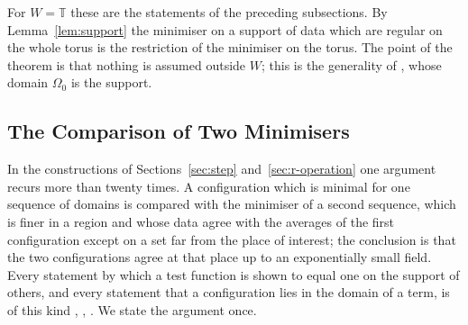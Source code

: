 \documentclass[11pt]{preprint}
\numberwithin{equation}{section}
\begin{document}
For $W = \mathbb T$ these are the statements of the preceding subsections. By Lemma~\ref{lem:support} the minimiser on a support of data which are regular on the whole torus is the restriction of the minimiser on the torus. The point of the theorem is that nothing is assumed outside $W$; this is the generality of \cite{BalabanVAR}, whose domain $\Omega_0$ is the support.

\subsection{The Comparison of Two Minimisers}\label{sec:comparison}

In the constructions of Sections~\ref{sec:step} and~\ref{sec:r-operation} one argument recurs more than twenty times. A configuration which is minimal for one sequence of domains is compared with the minimiser of a second sequence, which is finer in a region and whose data agree with the averages of the first configuration except on a set far from the place of interest; the conclusion is that the two configurations agree at that place up to an exponentially small field. Every statement by which a test function is shown to equal one on the support of others, and every statement that a configuration lies in the domain of a term, is of this kind \cite[(3.6)--(3.9), (3.17), (3.22)]{BalabanCRE}, \cite[(1.30), (1.34), (1.44), (1.56), (1.90), (1.93)]{BalabanLFR1}, \cite[(1.16), (1.19), (1.22), (1.36), (1.51)--(1.58)]{BalabanLFR2}. We state the argument once.
\end{document}
